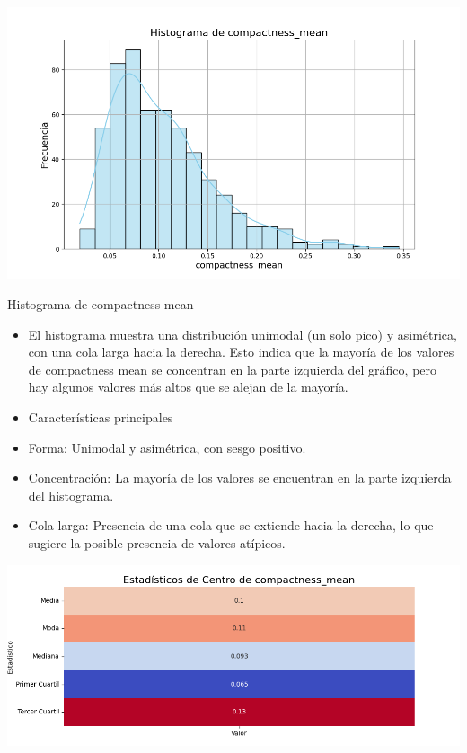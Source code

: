 \documentclass[a4paper, 12pt]{article}
\begin{document}
\includegraphics[width=\textwidth]{../Plots/plots_stats/compactness_mean/histograma_compactness_mean.png}

Histograma de compactness mean

\begin{itemize}
\item El histograma muestra una distribución unimodal (un solo pico) y asimétrica, con una cola larga hacia la derecha. Esto indica que la mayoría de los valores de compactness mean se concentran en la parte izquierda del gráfico, pero hay algunos valores más altos que se alejan de la mayoría.

\item Características principales

\item Forma: Unimodal y asimétrica, con sesgo positivo.
\item Concentración: La mayoría de los valores se encuentran en la parte izquierda del histograma.
\item Cola larga: Presencia de una cola que se extiende hacia la derecha, lo que sugiere la posible presencia de valores atípicos.
\end{itemize}

\includegraphics[width=\textwidth]{../Plots/plots_stats/compactness_mean/estadisticas_centro_compactness_mean.png}
\end{document}
